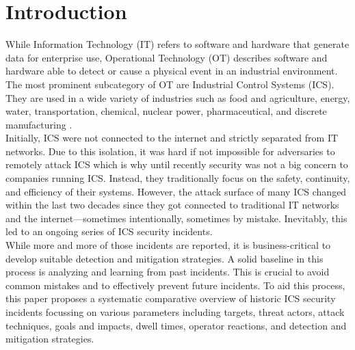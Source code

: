\documentclass[runningheads]{llncs}
\begin{document}
\section{Introduction}
While Information Technology (IT) refers to software and hardware that generate data for enterprise use, Operational Technology (OT) describes software and hardware able to detect or cause a physical event in an industrial environment.
The most prominent subcategory of OT are Industrial Control Systems (ICS).
They are used in a wide variety of industries such as food and agriculture, energy, water, transportation, chemical, nuclear power, pharmaceutical, and discrete manufacturing \cite{stouffer.2011}.\\
Initially, ICS were not connected to the internet and strictly separated from IT networks.
Due to this isolation, it was hard if not impossible for adversaries to remotely attack ICS which is why until recently security was not a big concern to companies running ICS.
Instead, they traditionally focus on the safety, continuity, and efficiency of their systems.
However, the attack surface of many ICS changed within the last two decades since they got connected to traditional IT networks and the internet---sometimes intentionally, sometimes by mistake.
Inevitably, this led to an ongoing series of ICS security incidents.\\
While more and more of those incidents are reported, it is business-critical to develop suitable detection and mitigation strategies.
A solid baseline in this process is analyzing and learning from past incidents.
This is crucial to avoid common mistakes and to effectively prevent future incidents.
To aid this process, this paper proposes a systematic comparative overview of historic ICS security incidents focussing on various parameters including targets, threat actors, attack techniques, goals and impacts, dwell times, operator reactions, and detection and mitigation strategies.
\end{document}
